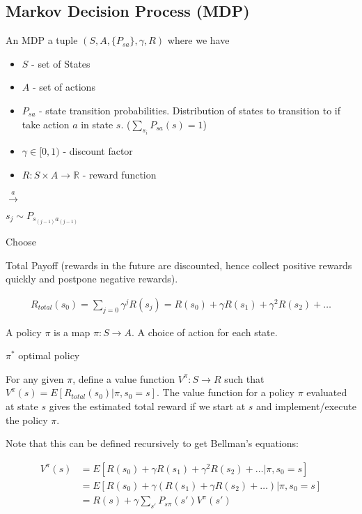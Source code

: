 \documentclass[letterpaper,10pt]{article}
\begin{document}
\subsection{Markov Decision Process (MDP)}

An MDP a tuple $(S, A, \{P_{sa} \}, \gamma, R)$ where we have
\begin{itemize}
\item$S$ - set of States

\item$A$ - set of actions

\item$P_{sa}$ - state transition probabilities. Distribution of states to transition to if take action $a$ in state $s$. ($\sum_{s_i} P_{sa}(s) = 1$)

\item $\gamma \in [0,1)$ - discount factor

\item$R : S \times A \rightarrow \mathbb{R}$ - reward function
\end{itemize}

$ \overset{a}{\rightarrow}$

$s_j \sim P_{s_{(j-1)}a_{(j-1)}}$


Choose

Total Payoff (rewards in the future are discounted, hence collect positive rewards quickly and postpone negative rewards).

\begin{align}
R_{total} (s_0) = \sum_{j=0} \gamma^j R(s_j) = R(s_0) + \gamma R(s_1) + \gamma^2 R(s_2) + \ldots
\end{align}


A policy $\pi$ is a map $\pi : S \rightarrow A$. A choice of action for each state.


$\pi^*$ optimal policy

For any given $\pi$, define a value function $V^\pi: S \rightarrow R$ such that $V^\pi(s) = E[R_{total}(s_0) | \pi, s_0 = s]$. The value function for a policy $\pi$ evaluated at state $s$ gives the estimated total reward if we start at $s$ and implement/execute the policy $\pi$.

Note that this can be defined recursively to get Bellman's equations:

\begin{align}
V^\pi(s) &= E\left[ R(s_0) + \gamma R(s_1) + \gamma^2 R(s_2) + \ldots | \pi, s_0 = s \right] \\
&= E\left[ R(s_0) + \gamma \left(R(s_1) + \gamma R(s_2) + \ldots\right) | \pi, s_0 = s \right] \\
&= R(s) + \gamma \sum_{s'} P_{s \pi} (s') V^\pi (s')
\end{align}
\end{document}

